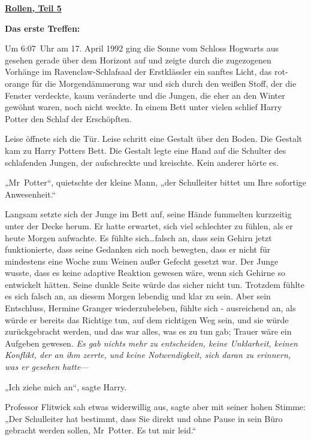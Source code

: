 

\hypertarget{rollen-teil-5}{%

\textbf{\uline{Rollen, Teil 5}}

\textbf{Das erste Treffen:}

Um 6:07~Uhr am 17. April 1992 ging die Sonne vom Schloss Hogwarts aus gesehen gerade über dem Horizont auf und zeigte durch die zugezogenen Vorhänge im Ravenclaw-Schlafsaal der Erstklässler ein sanftes Licht, das rot-orange für die Morgendämmerung war und sich durch den weißen Stoff, der die Fenster verdeckte, kaum veränderte und die Jungen, die eher an den Winter gewöhnt waren, noch nicht weckte. In einem Bett unter vielen schlief Harry Potter den Schlaf der Erschöpften.

Leise öffnete sich die Tür. Leise schritt eine Gestalt über den Boden. Die Gestalt kam zu Harry Potters Bett. Die Gestalt legte eine Hand auf die Schulter des schlafenden Jungen, der aufschreckte und kreischte. Kein anderer hörte es.

„Mr~Potter“, quietschte der kleine Mann, „der Schulleiter bittet um Ihre sofortige Anwesenheit.“

Langsam setzte sich der Junge im Bett auf, seine Hände fummelten kurzzeitig unter der Decke herum. Er hatte erwartet, sich viel schlechter zu fühlen, als er heute Morgen aufwachte. Es fühlte sich…falsch an, dass sein Gehirn jetzt funktionierte, dass seine Gedanken sich noch bewegten, dass er nicht für mindestens eine Woche zum Weinen außer Gefecht gesetzt war. Der Junge wusste, dass es keine adaptive Reaktion gewesen wäre, wenn sich Gehirne so entwickelt hätten. Seine dunkle Seite würde das sicher nicht tun. Trotzdem fühlte es sich falsch an, an diesem Morgen lebendig und klar zu sein. Aber sein Entschluss, Hermine Granger wiederzubeleben, fühlte sich - ausreichend an, als würde er bereits das Richtige tun, auf dem richtigen Weg sein, und sie würde zurückgebracht werden, und das war alles, was es zu tun gab; Trauer wäre ein Aufgeben gewesen. \emph{Es gab nichts mehr zu entscheiden, keine Unklarheit, keinen Konflikt, der an ihm zerrte, und keine Notwendigkeit, sich daran zu erinnern, was er gesehen hatte}—

„Ich ziehe mich an“, sagte Harry.

Professor Flitwick sah etwas widerwillig aus, sagte aber mit seiner hohen Stimme: „Der Schulleiter hat bestimmt, dass Sie direkt und ohne Pause in sein Büro gebracht werden sollen, Mr~Potter. Es tut mir leid.“

}
